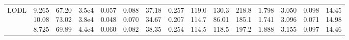 \begin{landscape}
\begin{table}[t]
{\begin{tabular}{@{}lrrrrrrrrrrrrrr@{}}
LODL & \makecell[r]{9.265\\10.08\\8.725} & \makecell[r]{67.20\\73.02\\69.89} & \makecell[r]{3.5e4\\3.8e4\\4.4e4} & \makecell[r]{0.057\\0.048\\0.060} & \makecell[r]{0.088\\0.070\\0.082} & \makecell[r]{37.18\\34.67\\38.35} & \makecell[r]{0.257\\0.207\\0.254} & \makecell[r]{119.0\\114.7\\114.5} & \makecell[r]{130.3\\86.01\\118.5} & \makecell[r]{218.8\\185.1\\197.2} & \makecell[r]{1.798\\1.741\\1.888} & \makecell[r]{3.050\\3.096\\3.155} & \makecell[r]{0.098\\0.071\\0.097} & \makecell[r]{14.45\\14.98\\14.46} \\

\end{tabular}}
\end{table}
\end{landscape}
